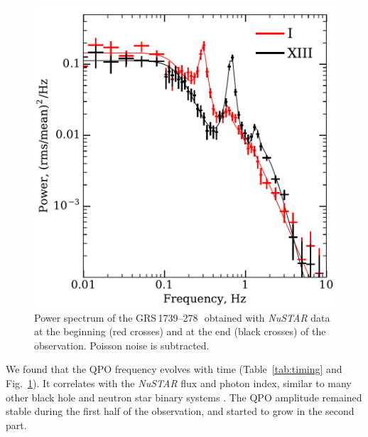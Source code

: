 \documentclass[a4paper,fleqn,usenatbib]{mnras}
\def\grs{{GRS\,1739--278\,}}
\begin{document}
\begin{figure}
        \includegraphics[width=\columnwidth]{qpo_centroid_evolution.pdf}
        \caption{Power spectrum of the \grs\ obtained with {\it NuSTAR} data at the beginning (red crosses) and at the end (black crosses) of the observation. Poisson noise is subtracted.}
        \label{fig:qpo}
\end{figure}


We found that the QPO frequency evolves with time (Table~\ref{tab:timing} and Fig.~\ref{fig:qpo}).
It correlates with the {\it NuSTAR} flux and photon index, similar to many other black hole and neutron star binary systems \citep[see, e.g.,][]{vignarca03,2003A&A...407.1039P}.
The QPO amplitude remained stable during the first half of the observation, and started to grow in the second part.
\end{document}

